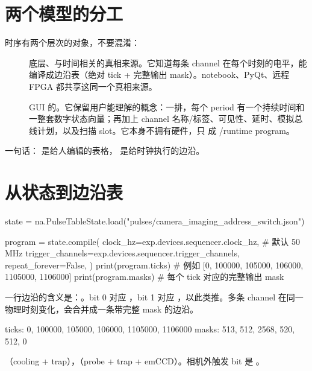 \documentclass[11pt,oneside,openany]{book}
\begin{document}
\section{两个模型的分工}
时序有两个层次的对象，不要混淆：

\begin{description}
  \item[] 底层、与时间相关的真相来源。它知道每条 channel 在每个时刻的电平，能编译成边沿表（绝对 tick + 完整输出 mask）。notebook、PyQt、远程 FPGA 都共享这同一个真相来源。
  \item[] GUI 的。它保留用户能理解的概念：一排，每个 period 有一个持续时间和一整套数字状态向量；再加上 channel 名称/标签、可见性、延时、模拟总线计划，以及扫描 slot。它本身不拥有硬件，只  成 /runtime program。
\end{description}

一句话： 是给人编辑的表格， 是给时钟执行的边沿。

\section{从状态到边沿表}
\begin{codeblock}[Python]
state = na.PulseTableState.load("pulses/camera_imaging_address_switch.json")

program = state.compile(
    clock_hz=exp.devices.sequencer.clock_hz,        # 默认 50 MHz
    trigger_channels=exp.devices.sequencer.trigger_channels,
    repeat_forever=False,
)
print(program.ticks)   # 例如 [0, 100000, 105000, 106000, 1105000, 1106000]
print(program.masks)   # 每个 tick 对应的完整输出 mask
\end{codeblock}

一行边沿的含义是：。bit 0 对应 ，bit 1 对应 ，以此类推。多条 channel 在同一物理时刻变化，会合并成一条带完整 mask 的边沿。

\begin{codeblock}
ticks: 0, 100000, 105000, 106000, 1105000, 1106000
masks: 513, 512, 2568, 520, 512, 0
\end{codeblock}

（cooling + trap），（probe + trap + emCCD）。相机外触发 bit 是 。
\end{document}
